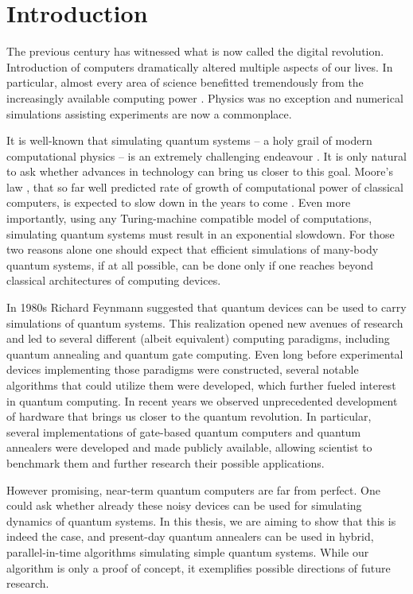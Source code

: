 \chapter*{Introduction}
The previous century has witnessed what is now called the digital revolution. Introduction of computers dramatically altered multiple aspects of our lives. In particular, almost every area of science benefitted tremendously from the increasingly available computing power \cite{winsberg}. Physics was no exception and numerical simulations assisting experiments are now a commonplace.

It is well-known that simulating quantum systems -- a holy grail of modern computational physics -- is an extremely challenging endeavour \cite{feynman.82}. It is only natural to ask whether advances in technology can bring us closer to this goal.  Moore's law \cite{mack}, that so far well predicted rate of growth of computational power of classical computers, is expected to slow down in the years to come \cite{waldrop, kumar}. Even more importantly, using any Turing-machine compatible model of computations, simulating quantum systems must result in an exponential slowdown. For those two reasons alone one should expect that efficient simulations of many-body quantum systems, if at all possible, can be done only if one reaches beyond classical architectures of computing devices.

In 1980s Richard Feynmann suggested that quantum devices can be used to carry simulations of quantum systems. This realization opened new avenues of research and led to several different (albeit equivalent) computing paradigms, including quantum annealing and quantum gate computing. Even long before experimental devices implementing those paradigms were constructed, several notable algorithms that could utilize them were developed, which further fueled interest in quantum computing. In recent years we observed unprecedented development of hardware that brings us closer to the quantum revolution. In particular, several implementations of gate-based quantum computers and quantum annealers were developed and made publicly available, allowing scientist to benchmark them and further research their possible applications.

However promising, near-term quantum computers are far from perfect. One could ask whether already these noisy devices can be used for simulating dynamics of quantum systems. In this thesis, we are aiming to show that this is indeed the case, and present-day quantum annealers can be used in hybrid, parallel-in-time algorithms simulating simple quantum systems. While our algorithm is only a proof of concept, it exemplifies possible directions of future research.

